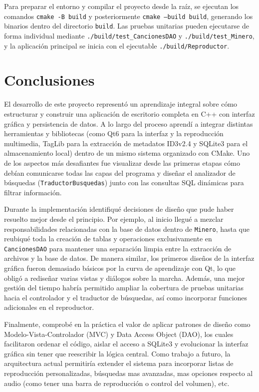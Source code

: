 \documentclass[11pt,a4paper]{article}
\begin{document}
    Para preparar el entorno y compilar el proyecto desde la raíz, se ejecutan los comandos \texttt{cmake -B build} y posteriormente \texttt{cmake --build build}, generando los binarios dentro del directorio \texttt{build}. Las pruebas unitarias pueden ejecutarse de forma individual mediante \texttt{./build/test\_CancionesDAO} y \texttt{./build/test\_Minero}, y la aplicación principal se inicia con el ejecutable \texttt{./build/Reproductor}.
    
    \section{Conclusiones}
    
    El desarrollo de este proyecto representó un aprendizaje integral sobre cómo estructurar y construir una aplicación de escritorio completa en C++ con interfaz gráfica y persistencia de datos. A lo largo del proceso aprendí a integrar distintas herramientas y bibliotecas (como Qt6 para la interfaz y la reproducción multimedia, TagLib para la extracción de metadatos ID3v2.4 y SQLite3 para el almacenamiento local) dentro de un mismo sistema organizado con CMake. Uno de los aspectos más desafiantes fue visualizar desde las primeras etapas cómo debían comunicarse todas las capas del programa y diseñar el analizador de búsquedas (\texttt{TraductorBusquedas}) junto con las consultas SQL dinámicas para filtrar información.
    
    Durante la implementación identifiqué decisiones de diseño que pude haber resuelto mejor desde el principio. Por ejemplo, al inicio llegué a mezclar responsabilidades relacionadas con la base de datos dentro de \texttt{Minero}, hasta que reubiqué toda la creación de tablas y operaciones exclusivamente en \texttt{CancionesDAO} para mantener una separación limpia entre la extracción de archivos y la base de datos. De manera similar, los primeros diseños de la interfaz gráfica fueron demasiado básicos por la curva de aprendizaje con Qt, lo que obligó a rediseñar varias vistas y diálogos sobre la marcha. Además, una mejor gestión del tiempo habría permitido ampliar la cobertura de pruebas unitarias hacia el controlador y el traductor de búsquedas, así como incorporar funciones adicionales en el reproductor.
    
    Finalmente, comprobé en la práctica el valor de aplicar patrones de diseño como Modelo-Vista-Controlador (MVC) y Data Access Object (DAO), los cuales facilitaron ordenar el código, aislar el acceso a SQLite3 y evolucionar la interfaz gráfica sin tener que reescribir la lógica central. Como trabajo a futuro, la arquitectura actual permitiría extender el sistema para incorporar listas de reproducción personalizadas, búsquedas mas avanzadas, mas opciones respecto al audio (como tener una barra de reproducción o control del volumen), etc.
\end{document}
